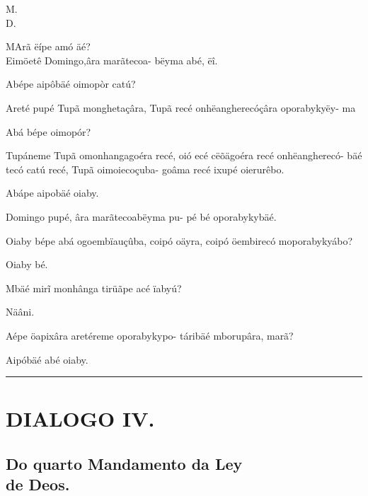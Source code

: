 \documentclass[openany,titlepage,12pt]{book}
\renewcommand{\chaptermark}[1]{\markboth{#1}{}}
\renewcommand{\sectionmark}[1]{\gdef\rightmark{#1}}
\newcommand{\comecalista}[5]{
    \hspace*{-11.7pt}
    \begin{minipage}[t]{0.08\linewidth}
        \flushright #1\\#2
    \end{minipage}
    \hspace{0pt}
    \begin{minipage}[t]{0.94\linewidth}
        \lettrine
        [findent =2pt, nindent=0pt,  lines=2]
        {#3}{#4}#5
    \end{minipage}
    \vspace*{-3pt}
}
\begin{document}
\chaptermark{Dialogo III.}
\sectionmark{Naõ juraràs, \&c.}
\vspace*{10pt}

\comecalista{M.}{D.}{M}{A}
{rã ëípe amó äé?\\
    \hspace*{-0.2ex}Eimöetê Domingo,âra marãtecoa-
    \hspace*{8ex}bëyma abé, ëî.
}
\begin{alternate}
    \item Abépe aipôbäé oimopòr catú?
    \item Areté pupé Tupã monghetaçâra, Tupã\pagebreak
    \newpage
        recé onhëangherecóçâra oporabykyëy-\linebreak
        ma
    \item Abá bépe oimopór?
    \item Tupáneme Tupã omonhangagoéra recé,
        oió ecé cëõägoéra recé onhëangherecó-\linebreak
        bäé tecó catú recé, Tupã oimoiecoçuba-\linebreak
        goâma recé ixupé oierurêbo.
    \item Abápe aipobäé oiaby.
    \item Domingo pupé, âra marãtecoabëyma pu-
        pé bé oporabykybäé.
    \item Oiaby bépe abá ogoembïauçûba, coipó
        oäyra, coipó öembirecó moporabykyábo?
    \item Oiaby bé.
    \item Mbäé mir\~i monhânga tirüãpe acé ïabyú?
    \item Näâni.
    \item Aépe öapixâra aretéreme oporabykypo-
        táribäé mborupâra, marã?
    \item Aipóbäé abé oiaby.
\end{alternate}

\vspace{2pt}
\par\noindent\rule{\textwidth}{0.4pt}
\unskip\vspace*{2pt}
\section{DIALOGO IV.}
\unskip\vspace{2pt}
\subsection{Do quarto Mandamento da Ley \\de Deos.}
\end{document}
